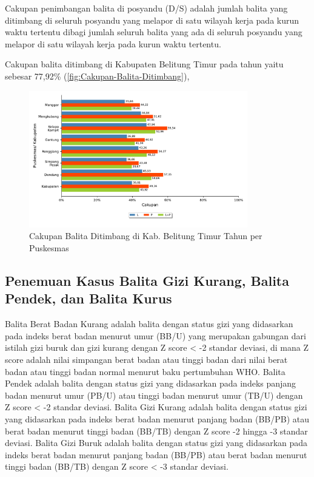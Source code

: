 Cakupan penimbangan balita di posyandu (D/S) adalah jumlah balita
yang ditimbang di seluruh posyandu yang melapor di satu wilayah kerja
pada kurun waktu tertentu dibagi jumlah seluruh balita yang ada di
seluruh posyandu yang melapor di satu wilayah kerja pada kurun waktu
tertentu.

Cakupan balita ditimbang di Kabupaten Belitung Timur pada tahun \tP yaitu sebesar 77,92\% (\autoref{fig:Cakupan-Balita-Ditimbang}), %

\begin{figure}[H]
  \centering
  \includegraphics[width=0.85\textwidth]{bab_05/bab_05_24_balitaDitimbang}
  \caption{Cakupan Balita Ditimbang di Kab. Belitung Timur Tahun \tP per Puskesmas}
  \label{fig:Cakupan-Balita-Ditimbang}
\end{figure}


\subsection{Penemuan Kasus Balita Gizi Kurang, Balita Pendek, dan Balita Kurus}
\label{subsec:Penemuan-Kasus-Gizi-Kurang}
Balita Berat Badan Kurang adalah balita dengan status gizi yang didasarkan pada indeks berat badan menurut umur (BB/U) yang merupakan gabungan dari istilah gizi buruk dan gizi kurang dengan Z score < -2 standar deviasi, di mana Z score adalah nilai simpangan berat badan atau tinggi badan dari nilai berat badan atau tinggi badan normal menurut baku pertumbuhan WHO.
Balita Pendek adalah balita dengan status gizi yang didasarkan pada indeks panjang badan menurut umur (PB/U) atau tinggi badan menurut umur (TB/U) dengan Z score < -2 standar deviasi.
Balita Gizi Kurang adalah balita dengan status gizi yang didasarkan pada indeks berat badan menurut panjang badan (BB/PB) atau berat badan menurut tinggi badan (BB/TB) dengan Z score -2 hingga -3 standar deviasi.
Balita Gizi Buruk adalah balita dengan status gizi yang didasarkan pada indeks berat badan menurut panjang badan (BB/PB) atau berat badan menurut tinggi badan (BB/TB) dengan Z score < -3 standar deviasi.

